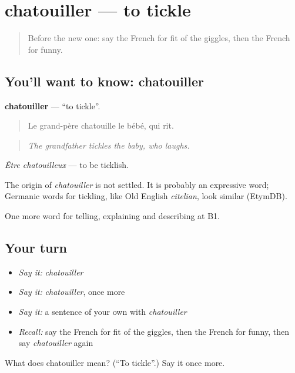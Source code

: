 \section[chatouiller]{chatouiller — to tickle}

\label{lesson:FR-C474-chatouiller}



\begin{quote}
Before the new one: say the French for fit of the giggles, then the French for funny.
\end{quote}

\subsection*{You'll want to know: chatouiller}
\textbf{chatouiller} — \textquotedblleft{}to tickle\textquotedblright{}.

\begin{quote}
Le grand-père chatouille le bébé, qui rit.
\end{quote}

\begin{quote}
\emph{The grandfather tickles the baby, who laughs.}
\end{quote}

\emph{Être chatouilleux} — to be ticklish.

\begin{cousinweb}
The origin of \emph{chatouiller} is not settled. It is probably an expressive word; Germanic words for tickling, like Old English \emph{citelian}, look similar (EtymDB).
\end{cousinweb}

\begin{grammarlens}[title={What you've built}]
One more word for telling, explaining and describing at B1.
\end{grammarlens}

\subsection*{Your turn}
\begin{itemize}
\raggedright
  \item \emph{Say it:} \emph{chatouiller}
  \item \emph{Say it:} \emph{chatouiller}, once more
  \item \emph{Say it:} a sentence of your own with \emph{chatouiller}
  \item \emph{Recall:} say the French for fit of the giggles, then the French for funny, then say \emph{chatouiller} again
\end{itemize}

\begin{tcolorbox}[breakable,colback=teal!4,colframe=teal!35!black,title={Before you move on}]
What does chatouiller mean? (\textquotedblleft{}To tickle\textquotedblright{}.) Say it once more.
\end{tcolorbox}
